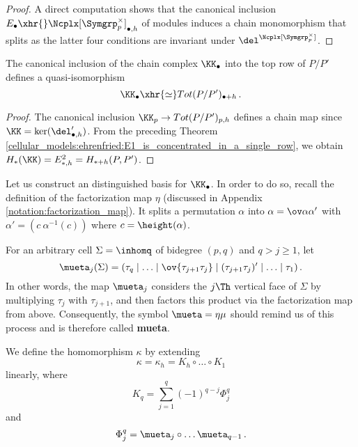 \begin{proof}
A direct computation shows that the canonical inclusion $E_\bullet \xhr{} \Ncplx[\Symgrp^\times_p]_{\bullet,h}$ of modules induces a chain monomorphism that splits
as the latter four conditions are invariant under $\del^{\Ncplx[\Symgrp^\times_p]}$.
\end{proof}

\begin{cor}
    \label{cellular_models:ehrenfried:KK_is_qi_subcomplex}
    The canonical inclusion of the chain complex $\KK_\bullet$ into the top row of $P/P'$ defines a quasi-isomorphism
    \[
        \KK_\bullet \xhr{\simeq} Tot(P/P')_{\bullet + h} \,.
    \]
\end{cor}

\begin{proof}
    The canonical inclusion $\KK_p \to Tot(P/P')_{p,h}$ defines a chain map since $\KK = \ker( \del'_{\bullet,h} )$.
    From the preceding Theorem \ref{cellular_models:ehrenfried:E1_is_concentrated_in_a_single_row}, we obtain
    $H_\ast(\KK) = E^2_{\ast,h} = H_{\ast+h}(P,P')$.
\end{proof}

Let us construct an distinguished basis for $\KK_\bullet$.
In order to do so, recall the definition of the factorization map $\eta$ (discussed in Appendix \ref{notation:factorization_map}).
It splits a permutation $\alpha$ into $\alpha = \ov \alpha \alpha'$ with $\alpha' = ( c\ \alpha^{-1}(c))$ where $c = \height(\alpha)$.

\begin{defi}
    \label{cellular_models:ehrenfried:mueta}
    For an arbitrary cell $\Sigma = \inhomq$ of bidegree $(p,q)$ and $q > j \ge 1$, let
    \[
        \mueta_j (\Sigma) = (\tau_q \mid \ldots \mid \ov{\tau_{j+1}\tau_j} \mid (\tau_{j+1}\tau_j)' \mid \ldots \mid \tau_1) \,.
    \]
    In other words, the map $\mueta_j$ considers the $j\Th$ vertical face of $\Sigma$ by multiplying $\tau_j$ with $\tau_{j+1}$,
    and then factors this product via the factorization map from above.
    Consequently, the symbol $\mueta = \eta\mu$ should remind us of this process and is therefore called {\bfseries mueta}.
\end{defi}

\begin{defi}
    \label{cellular_models:ehrenfried:definition_kappa}
    We define the homomorphism $\kappa$ by extending
    \[
        \kappa = \kappa_h = K_h \circ \ldots \circ K_1
    \]
    linearly, where
    \[
        K_q = \sum_{j=1}^q (-1)^{q-j} \Phi_{j}^q
    \]
    and
    \[
        \Phi_j^q = \mueta_j \circ \ldots \mueta_{q-1} \,.
    \]
\end{defi}

